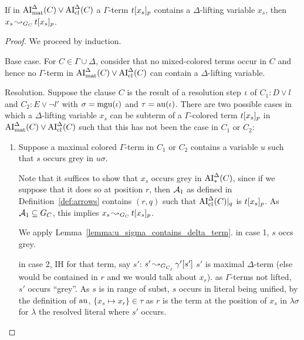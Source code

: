 \documentclass[,%
	draft=false,%
	numbers=noendperiod
	11pt,
	a4paper,
	oneside,%
	openany,
]{memoir}
\begin{document}
\begin{lemma}
	If in $\operatorname{AI}_\mathrm{mat}^\Delta(C) \lor \operatorname{AI}_\mathrm{cl}^\Delta(C)$ a
	$\Gamma$-term $t{[x_s]_{p}}$ contains a $\Delta$-lifting variable $x_s$, then $x_s \operatorname{\leadsto}_{G_C} t{[x_s]_{p}}$.
\end{lemma}
\begin{proof}
	We proceed by induction.

	\begin{description}
		\item{}Base case.
			For $C \in \Gamma\cup\Delta$, consider that no mixed-colored terms occur in $C$ and hence no $\Gamma$-term in $\operatorname{AI}_\mathrm{mat}^\Delta(C) \lor \operatorname{AI}_\mathrm{cl}^\Delta(C)$ can contain a $\Delta$-lifting variable.

		\item{}Resolution.
			Suppose the clause $C$ is the result of a resolution step $\iota$ of $C_1: D \lor l$ and $C_2: E \lor \lnot l'$ with $\sigma = \operatorname{mgu}(\iota)$ and $\tau = \operatorname{au}(\iota)$.
			There are two possible cases in which a $\Delta$-lifting variable $x_s$ can be subterm of a $\Gamma$-colored term $t{[x_s]_{p}}$ in $\operatorname{AI}_\mathrm{mat}^\Delta(C)\lor \operatorname{AI}_\mathrm{cl}^\Delta(C)$ such that this has not been the case in $C_1$ or $C_2$:

			\begin{enumerate}

				\item Suppose a maximal colored $\Gamma$-term in $C_1$ or $C_2$ contains a variable $u$ such that $s$ occurs grey in $u\sigma$.
					\label{25_1}

					Note that it suffices to show that $x_s$ occurs grey in $\operatorname{AI}_\mathrm{*}^\Delta(C)$,
					since if we suppose that it does so at position $r$,
					then $\operatorname{\mathcal{A}}_1$ as defined in Definition~\ref{def:arrows} contains $(r, q)$ such that $\operatorname{AI}_\mathrm{cl}^\Delta(C)|_{q}$ is $t{[x_s]_{p}}$.
					As $\operatorname{\mathcal{A}}_1 \subseteq G_C$, this implies $x_s \operatorname{\leadsto}_{G_C} t{[x_s]_{p}}$.

					We apply Lemma~\ref{lemma:u_sigma_contains_delta_term}.
					in case 1, $s$ occs grey.

					in case 2, IH for that term, say $s'$: $s' \operatorname{\leadsto}_{G_{C_j}} \gamma'[s']$
					$s'$ is maximal $\Delta$-term (else would be contained in $r$ and we would talk about $x_r$).
					as $\Gamma$-terms not lifted, $s'$ occurs ``grey''.
					As $s$ is in range of subst, $s$ occurs in literal being unified,
					by the definition of $\operatorname{au}$, $\{x_s \mapsto x_r\} \in \tau$
					as $r$ is the term at the position of $x_s$ in $\lambda\sigma$ for $\lambda$ the resolved literal where $s'$ occurs.


\end{enumerate}
\end{description}
\end{proof}
\end{document}
